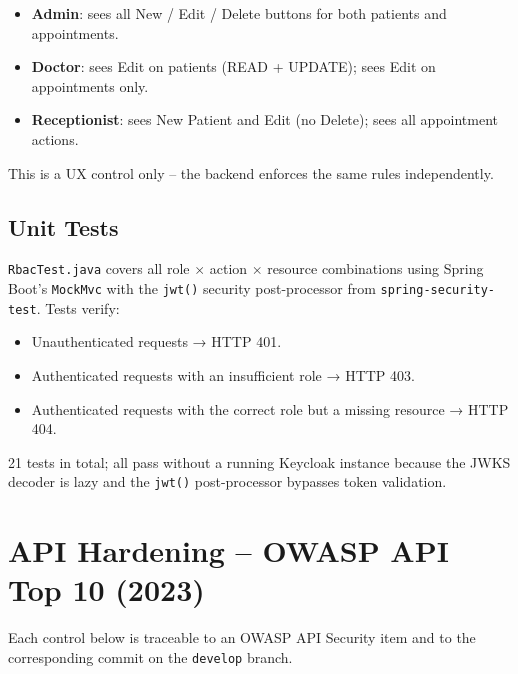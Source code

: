 \documentclass[12pt,a4paper]{report}
\begin{document}
\begin{itemize}
  \item \textbf{Admin}: sees all New / Edit / Delete buttons for both patients and appointments.
  \item \textbf{Doctor}: sees Edit on patients (READ + UPDATE); sees Edit on appointments only.
  \item \textbf{Receptionist}: sees New Patient and Edit (no Delete); sees all appointment actions.
\end{itemize}

This is a UX control only -- the backend enforces the same rules independently.

\subsection{Unit Tests}

\texttt{RbacTest.java} covers all role $\times$ action $\times$ resource combinations using
Spring Boot's \texttt{MockMvc} with the \texttt{jwt()} security post-processor from
\texttt{spring-security-test}. Tests verify:

\begin{itemize}
  \item Unauthenticated requests → HTTP 401.
  \item Authenticated requests with an insufficient role → HTTP 403.
  \item Authenticated requests with the correct role but a missing resource → HTTP 404.
\end{itemize}

21 tests in total; all pass without a running Keycloak instance because the JWKS decoder
is lazy and the \texttt{jwt()} post-processor bypasses token validation.

\section{API Hardening -- OWASP API Top 10 (2023)}

Each control below is traceable to an OWASP API Security item and to the corresponding
commit on the \texttt{develop} branch.
\end{document}

